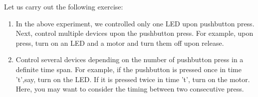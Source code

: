 \begin{exercise}
Let us carry out the following exercise:
\begin{enumerate}
\item In the above experiment, we controlled only one LED upon
  pushbutton press. Next, control multiple devices upon the pushbutton
  press. For example, upon press, turn on an LED and a motor and turn
  them off upon release.
\item Control several devices depending on the number of pushbutton
  press in a definite time span. For example, if the pushbutton is
  pressed once in time 't',say, turn on the LED. If it is pressed
  twice in time 't', turn on the motor. Here, you may want to consider
  the timing between two consecutive press.
\end{enumerate}
\end{exercise}

